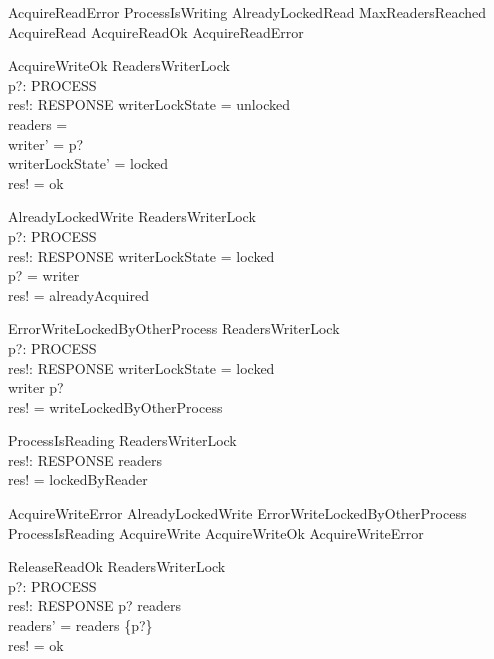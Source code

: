 \documentclass{article}
\begin{document}
\begin{zed}
AcquireReadError  ProcessIsWriting \lor AlreadyLockedRead \lor MaxReadersReached  
\also
AcquireRead  AcquireReadOk \lor AcquireReadError 
\end{zed}

\begin{schema}{AcquireWriteOk}
    \Delta ReadersWriterLock \\
    p?: PROCESS \\
    res!: RESPONSE
\where
    writerLockState = unlocked \\
    readers = \emptyset \\
    writer' = p? \\
    writerLockState' = locked \\
    res! = ok
\end{schema}

\begin{schema}{AlreadyLockedWrite}
    \Xi ReadersWriterLock \\
    p?: PROCESS \\
    res!: RESPONSE
\where
    writerLockState = locked \\
    p? = writer \\
    res! = alreadyAcquired
\end{schema}

\begin{schema}{ErrorWriteLockedByOtherProcess}
    \Xi ReadersWriterLock \\
    p?: PROCESS \\
    res!: RESPONSE
\where
    writerLockState = locked \\
    writer \neq p? \\
    res! = writeLockedByOtherProcess
\end{schema}

\begin{schema}{ProcessIsReading}
    \Xi ReadersWriterLock \\
    res!: RESPONSE
\where
    readers \neq \emptyset \\
    res! = lockedByReader
\end{schema}

\begin{zed}
AcquireWriteError  AlreadyLockedWrite \lor ErrorWriteLockedByOtherProcess \lor ProcessIsReading 
\also
AcquireWrite  AcquireWriteOk \lor AcquireWriteError 
\end{zed}

\begin{schema}{ReleaseReadOk}
    \Delta ReadersWriterLock \\
    p?: PROCESS \\
    res!: RESPONSE
\where
    p? \in readers \\
    readers' = readers \setminus \{p?\} \\
    res! = ok
\end{schema}
\end{document}
